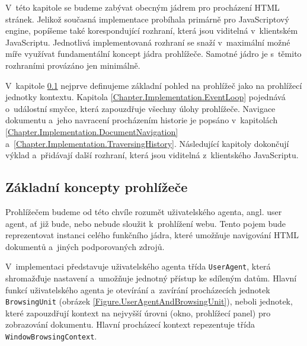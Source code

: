 V~této kapitole se budeme zabývat obecným jádrem pro procházení HTML stránek. Jelikož současná implementace probíhala primárně pro JavaScriptový engine, popíšeme také korespondující rozhraní, která jsou viditelná v~klientském JavaScriptu. Jednotlivá implementovaná rozhraní se snaží v~maximální možné míře využívat fundamentální koncept jádra prohlížeče. Samotné jádro je s~těmito rozhraními provázáno jen minimálně.

V~kapitole \ref{Chapter.Implementation.BasicConcepts} nejprve definujeme základní pohled na prohlížeč jako na prohlížecí jednotky kontextu. Kapitola \ref{Chapter.Implementation.EventLoop} pojednává o~událostní smyčce, která zapouzdřuje všechny úlohy prohlížeče. Navigace dokumentu a~jeho navracení procházením historie je popsáno v~kapitolách \ref{Chapter.Implementation.DocumentNavigation} a~\ref{Chapter.Implementation.TraversingHistory}. Následující kapitoly dokončují výklad a~přidávají další rozhraní, která jsou viditelná z~klientského JavaScriptu. 

\subsection{Základní koncepty prohlížeče}
\label{Chapter.Implementation.BasicConcepts}

Prohlížečem budeme od této chvíle rozumět uživatelského agenta, angl. user agent, ať již bude, nebo nebude sloužit k~prohlížení webu. Tento pojem bude reprezentovat instanci celého funkčního jádra, které umožňuje navigování HTML dokumentů a~jiných podporovaných zdrojů.

V~implementaci představuje uživatelského agenta třída \texttt{UserAgent}, která shromažďuje nastavení a~umožňuje jednotný přístup ke sdíleným datům. Hlavní funkcí uživatelského agenta je otevírání a~zavírání procházecích jednotek \texttt{BrowsingUnit} (obrázek \ref{Figure.UserAgentAndBrowsingUnit}), neboli jednotek, které zapouzdřují kontext na nejvyšší úrovni (okno, prohlížecí panel) pro zobrazování dokumentu. Hlavní procházecí kontext repezentuje třída \texttt{WindowBrowsingContext}.

